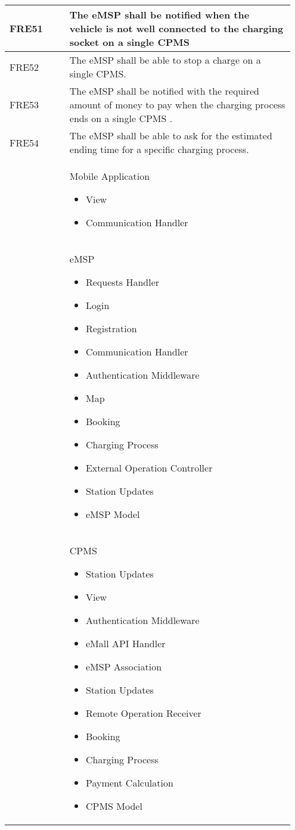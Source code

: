 {\begin{longtable}{|p{0.20\linewidth}p{0.75\linewidth} |}
    \hline
    \rowcolor{bluepoli!15} FRE51 & The eMSP shall be notified when the vehicle is not well connected to the charging socket on a single CPMS \\
    \hline
    \rowcolor{bluepoli!15} FRE52 & The eMSP shall be able to stop a charge on a single CPMS. \\
    \hline
    \rowcolor{bluepoli!15} FRE53 &  The eMSP shall be notified with the required amount of money to pay when the charging process ends on a single CPMS .\\
    \hline
    \rowcolor{bluepoli!15} FRE54 & The eMSP shall be able to ask for the estimated ending time for a specific charging process. \\
    \hline
    \rowcolor{bluepoli!5}  & Mobile Application  \newline
    \begin{itemize}
        \item View
        \item Communication Handler
    \end{itemize} \\
    \hline
    \rowcolor{bluepoli!5}  & eMSP  \newline
    \begin{itemize}
        \item Requests Handler
        \item Login
        \item Registration
        \item Communication
        Handler
        \item Authentication Middleware
        \item Map
        \item Booking
        \item Charging Process
        \item External Operation Controller
        \item Station Updates
        \item eMSP Model
    \end{itemize} \\
    \hline
    \rowcolor{bluepoli!5}  & CPMS  \newline
    \begin{itemize}
        \item Station Updates
        \item View
        \item Authentication Middleware
        \item eMall API Handler
        \item eMSP Association
        \item Station Updates
        \item Remote Operation Receiver
        \item Booking
        \item Charging Process
        \item Payment Calculation
        \item CPMS Model
    \end{itemize} \\
    \hline
\end{longtable}}
